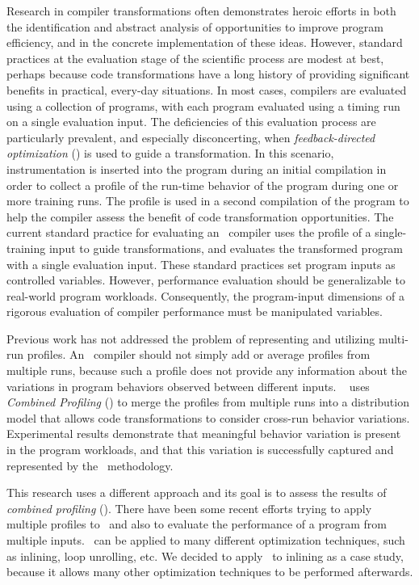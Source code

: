 
Research in compiler transformations often demonstrates heroic efforts in both the identification and abstract analysis of opportunities to improve program efficiency, and in the concrete implementation of these ideas.  However, standard practices at the evaluation stage of the scientific process are modest at best, perhaps because code transformations have a long history of providing significant benefits in practical, every-day situations.  In most cases, compilers are evaluated using a collection of programs, with each program evaluated using a timing run on a single evaluation input.  The deficiencies of this evaluation process are particularly prevalent, and especially disconcerting, when {\it feedback-directed optimization} (\FDI) is used to guide a transformation.  In this scenario, instrumentation is inserted into the program during an initial compilation in order to collect a profile of the run-time behavior of the program during one or more training runs.  The profile is used in a second compilation of the program to help the compiler assess the benefit of code transformation opportunities.  The current standard practice for evaluating an \FDI\ compiler uses the profile of a single-training input to guide transformations, and evaluates the transformed program with a single evaluation input.  These standard practices set program inputs as controlled variables.  However, performance evaluation should be generalizable to real-world program workloads. Consequently, the program-input dimensions of a rigorous evaluation of compiler performance must be manipulated variables.


Previous work has not addressed the problem of representing and utilizing multi-run profiles.  An \FDI\ compiler should not simply add or average profiles from multiple runs, because such a profile does not provide any information about the variations in program behaviors observed between different inputs. ~\cite{BerubePhD} uses {\it Combined Profiling} (\CP) to merge the profiles from multiple runs into a distribution model that allows code transformations to consider cross-run behavior variations.  Experimental results demonstrate that meaningful behavior variation is present in the program workloads, and that this variation is successfully captured and represented by the \CP\ methodology.

This research uses a different approach and its goal is to assess the results of {\em combined profiling} (\CP). There have been some recent efforts trying to apply multiple profiles to \FDI\, and also to evaluate the performance of a program from multiple inputs. \CP\ can be applied to many different optimization techniques, such as inlining, loop unrolling, etc. We decided to apply \CP\ to inlining as a case study, because it allows many other optimization techniques to be performed afterwards.

